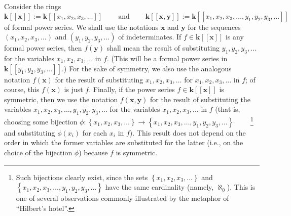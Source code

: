 \documentclass[numbers=enddot,12pt,final,onecolumn,notitlepage]{scrartcl}%
\theoremstyle{definition}
\begin{document}
Consider the rings
\[
\mathbf{k}\left[  \left[  \mathbf{x}\right]  \right]  :=\mathbf{k}\left[
\left[  x_{1},x_{2},x_{3},\ldots\right]  \right]
\ \ \ \ \ \ \ \ \ \ \text{and}\ \ \ \ \ \ \ \ \ \ \mathbf{k}\left[  \left[
\mathbf{x},\mathbf{y}\right]  \right]  :=\mathbf{k}\left[  \left[  x_{1}%
,x_{2},x_{3},\ldots,y_{1},y_{2},y_{3},\ldots\right]  \right]
\]
of formal power series. We shall use the notations $\mathbf{x}$ and
$\mathbf{y}$ for the sequences $\left(  x_{1},x_{2},x_{3},\ldots\right)  $ and
$\left(  y_{1},y_{2},y_{3},\ldots\right)  $ of indeterminates. If
$f\in\mathbf{k}\left[  \left[  \mathbf{x}\right]  \right]  $ is any formal
power series, then $f\left(  \mathbf{y}\right)  $ shall mean the result of
substituting $y_{1},y_{2},y_{3},\ldots$ for the variables $x_{1},x_{2}%
,x_{3},\ldots$ in $f$. (This will be a formal power series in $\mathbf{k}%
\left[  \left[  y_{1},y_{2},y_{3},\ldots\right]  \right]  $.) For the sake of
symmetry, we also use the analogous notation $f\left(  \mathbf{x}\right)  $
for the result of substituting $x_{1},x_{2},x_{3},\ldots$ for $x_{1}%
,x_{2},x_{3},\ldots$ in $f$; of course, this $f\left(  \mathbf{x}\right)  $ is
just $f$. Finally, if the power series $f\in\mathbf{k}\left[  \left[
\mathbf{x}\right]  \right]  $ is symmetric, then we use the notation $f\left(
\mathbf{x},\mathbf{y}\right)  $ for the result of substituting the variables
$x_{1},x_{2},x_{3},\ldots,y_{1},y_{2},y_{3},\ldots$ for the variables
$x_{1},x_{2},x_{3},\ldots$ in $f$ (that is, choosing some bijection
$\phi:\left\{  x_{1},x_{2},x_{3},\ldots\right\}  \rightarrow\left\{
x_{1},x_{2},x_{3},\ldots,y_{1},y_{2},y_{3},\ldots\right\}  $%
\ \ \ \ \footnote{Such bijections clearly exist, since the sets $\left\{
x_{1},x_{2},x_{3},\ldots\right\}  $ and $\left\{  x_{1},x_{2},x_{3}%
,\ldots,y_{1},y_{2},y_{3},\ldots\right\}  $ have the same cardinality (namely,
$\aleph_{0}$). This is one of several observations commonly illustrated by the
metaphor of \textquotedblleft Hilbert's hotel\textquotedblright.} and
substituting $\phi\left(  x_{i}\right)  $ for each $x_{i}$ in $f$). This
result does not depend on the order in which the former variables are
substituted for the latter (i.e., on the choice of the bijection $\phi$)
because $f$ is symmetric.
\end{document}
